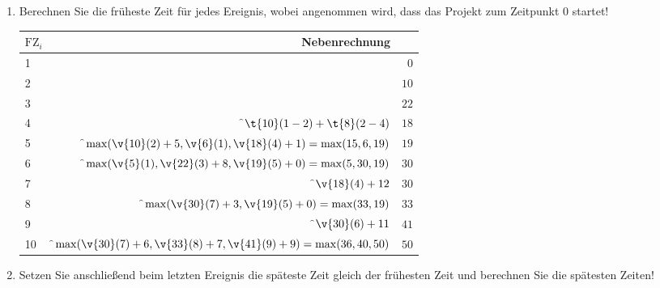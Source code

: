 \documentclass{lehramt-informatik-aufgabe}
\begin{document}
\begin{enumerate}


\item Berechnen Sie die früheste Zeit für jedes Ereignis, wobei
angenommen wird, dass das Projekt zum Zeitpunkt 0 startet!

\begin{liAntwort}
\begin{tabular}{|l|r|r|}
\hline
$\text{FZ}_i$ & Nebenrechnung & \\\hline\hline
1 &                                                                           & $0$ \\\hline
2 &                                                                           & $10$ \\\hline
3 &                                                                           & $22$ \\\hline
4 & \f$\t{10}(1-2) + \t{8}(2-4) $                                             & $18$ \\\hline
5 & \f$\max(\v{10}(2) + 5,\v{6}(1),\v{18}(4) + 1) = \max(15,6,19)$            & $19$ \\\hline
6 & \f$\max(\v{5}(1),\v{22}(3) + 8, \v{19}(5) + 0) = \max(5, 30, 19)$         & $30$ \\\hline
7 & \f$\v{18}(4) + 12$                                                        & $30$ \\\hline
8 & \f$\max(\v{30}(7) + 3, \v{19}(5) + 0) = \max(33,19)$                      & $33$ \\\hline
9 & \f$\v{30}(6) + 11$                                                        & $41$ \\\hline
10 & \f$\max(\v{30}(7) + 6, \v{33}(8) + 7, \v{41}(9) + 9) = \max(36, 40, 50)$ & $50$ \\\hline
\end{tabular}
\end{liAntwort}


\item Setzen Sie anschließend beim letzten Ereignis die späteste Zeit
gleich der frühesten Zeit und berechnen Sie die spätesten Zeiten!


\end{enumerate}
\end{document}
